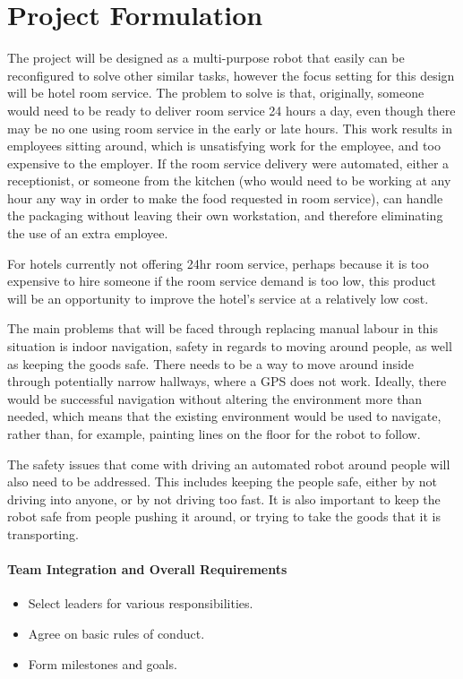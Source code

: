 \documentclass[11pt]{article}
\begin{document}
\newpage
\section{Project Formulation}
The project will be designed as a multi-purpose robot that easily can be reconfigured to solve other similar tasks, however the focus setting for this design will be hotel room service. The problem to solve is that, originally, someone would need to be ready to deliver room service 24 hours a day, even though there may be no one using room service in the early or late hours. This work results in employees sitting around, which is unsatisfying work for the employee, and too expensive to the employer. If the room service delivery were automated, either a receptionist, or someone from the kitchen (who would need to be working at any hour any way in order to make the food requested in room service), can handle the packaging without leaving their own workstation, and therefore eliminating the use of an extra employee.


For hotels currently not offering 24hr room service, perhaps because it is too expensive to hire someone if the room service demand is too low, this product will be an opportunity to improve the hotel’s service at a relatively low cost.


The main problems that will be faced through replacing manual labour in this situation is indoor navigation, safety in regards to moving around people, as well as keeping the goods safe. There needs to be a way to move around inside through potentially narrow hallways, where a GPS does not work. Ideally, there would be successful navigation without altering the environment more than needed, which means that the existing environment would be used to navigate, rather than, for example, painting lines on the floor for the robot to follow.


The safety issues that come with driving an automated robot around people will also need to be addressed. This includes keeping the people safe, either by not driving into anyone, or by not driving too fast. It is also important to keep the robot safe from people pushing it around, or trying to take the goods that it is transporting.

\paragraph{Team Integration and Overall Requirements}
\begin{itemize}
\item{Select leaders for various responsibilities.}
\item{Agree on basic rules of conduct.}
\item{Form milestones and goals.}
\end{itemize}
\end{document}

